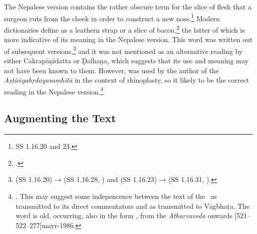 The Nepalese version contains the rather obscure term  for the slice
of flesh that a surgeon cuts from the cheek in order to construct a new
nose.\footnote{SS 1.16.20 and 23.} Modern dictionaries define  as a
    leathern strap or a slice of bacon,\footcites[1385]{apte-prac}[917]{moni-sans} the
    latter of which is more indicative of its meaning in the Nepalese version. This
    word was written out of subsequent versions,\footnote{ (SS 1.16.20) →
         (SS 1.16.28, \cite[81]{vulgate}) and 
        (SS 1.16.23) →  (SS 1.16.31, \cite[81]{vulgate}).} and it was
        not mentioned as an alternative reading by either Cakrapāṇidatta or Ḍalhaṇa, which
        suggests that its use and meaning may not have been known to them. However,
         was used by the author of the \emph{Aṣṭāṅgahṛdayasaṃhitā} in the
        context of rhinoplasty, so it likely to be the correct reading in the Nepalese
        version.\footnote{. This may suggest some indepencence 
        between
            the text of the \SS\ as transmitted to its direct commentators and as transmitted
            to Vāgbhaṭa. The word  is old, occurring, also in the form
            , from the \emph{Atharvaveda} onwards
            [521--522--277]{mayr-1986}.}



%

\subsection{Augmenting the Text}

